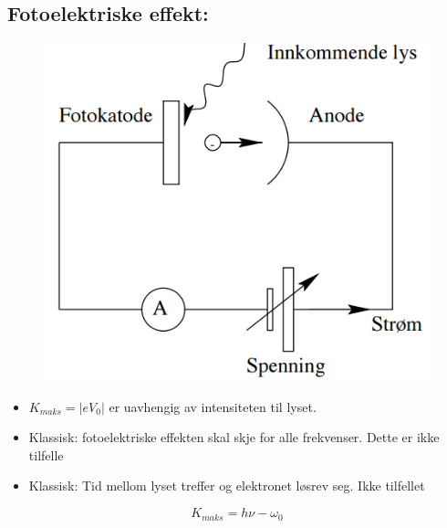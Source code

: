 \documentclass[a4paper,norsk, 10pt]{article}
\begin{document}
\subsection{Fotoelektriske effekt:}
\begin{figure}[H]
\centering
\includegraphics[scale=0.2]{fotoelektriske.png}
\end{figure}
\begin{itemize}
\item $K_{maks} = |eV_0|$ er uavhengig av intensiteten til lyset.
\item Klassisk: fotoelektriske effekten skal skje for alle frekvenser. Dette er ikke tilfelle
\item Klassisk: Tid mellom lyset treffer og elektronet løsrev seg. Ikke tilfellet
\end{itemize}

\begin{equation}
K_{maks} = h\nu - \omega_0
\end{equation}
\end{document}
